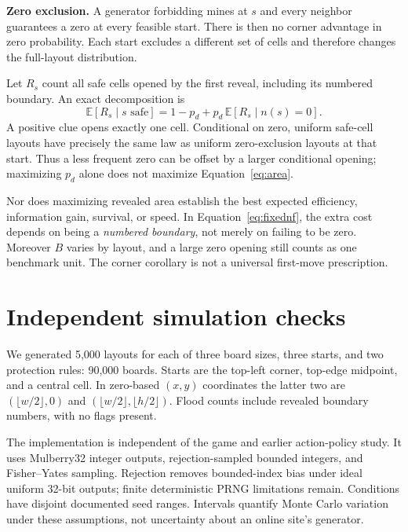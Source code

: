 \documentclass[11pt,letterpaper]{article}
\newcommand{\E}{\mathbb{E}}
\begin{document}
\textbf{Zero exclusion.} A generator forbidding mines at $s$ and every neighbor guarantees a zero at every feasible start. There is then no corner advantage in zero probability. Each start excludes a different set of cells and therefore changes the full-layout distribution.

Let $R_s$ count all safe cells opened by the first reveal, including its numbered boundary. An exact decomposition is
\begin{equation}\label{eq:area}
 \E[R_s\mid s\text{ safe}]=1-p_d+p_d\,\E[R_s\mid n(s)=0].
\end{equation}
A positive clue opens exactly one cell. Conditional on zero, uniform safe-cell layouts have precisely the same law as uniform zero-exclusion layouts at that start. Thus a less frequent zero can be offset by a larger conditional opening; maximizing $p_d$ alone does not maximize Equation~\eqref{eq:area}.

Nor does maximizing revealed area establish the best expected efficiency, information gain, survival, or speed. In Equation~\eqref{eq:fixednf}, the extra cost depends on being a \emph{numbered boundary}, not merely on failing to be zero. Moreover $B$ varies by layout, and a large zero opening still counts as one benchmark unit. The corner corollary is not a universal first-move prescription.

\section{Independent simulation checks}
We generated 5,000 layouts for each of three board sizes, three starts, and two protection rules: 90,000 boards. Starts are the top-left corner, top-edge midpoint, and a central cell. In zero-based $(x,y)$ coordinates the latter two are $(\lfloor w/2\rfloor,0)$ and $(\lfloor w/2\rfloor,\lfloor h/2\rfloor)$. Flood counts include revealed boundary numbers, with no flags present.

The implementation is independent of the game and earlier action-policy study. It uses Mulberry32 integer outputs, rejection-sampled bounded integers, and Fisher--Yates sampling. Rejection removes bounded-index bias under ideal uniform 32-bit outputs; finite deterministic PRNG limitations remain. Conditions have disjoint documented seed ranges. Intervals quantify Monte Carlo variation under these assumptions, not uncertainty about an online site's generator.
\end{document}
